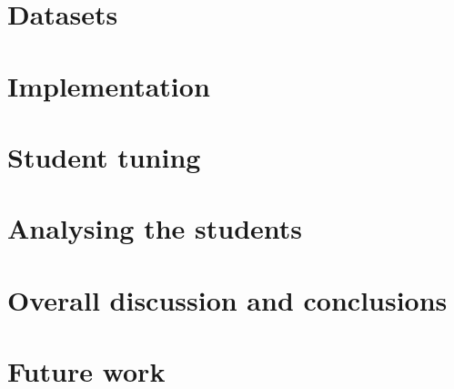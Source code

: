 \documentclass[bsc,frontabs,twoside,singlespacing,parskip,deptreport]{infthesis}
\begin{document}
\chapter{Datasets}{
}

\chapter{Implementation}{
}

\chapter{Student tuning}{
}

\chapter{Analysing the students}{
}

\chapter{Overall discussion and conclusions}{}

\chapter{Future work}{}
\end{document}

